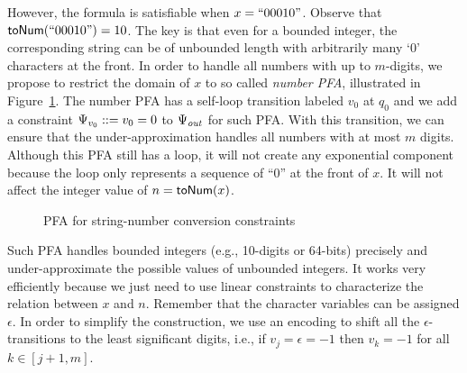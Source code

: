 \documentclass[sigplan,review,anonymous]{acmart}\settopmatter{printfolios=true,printccs=false,printacmref=false}
\begin{document}
However, the formula is satisfiable when $x=``00010"$. Observe that $\mbox{\textsf{toNum}($``00010"$)}=10$. The key is that even for a bounded integer, the corresponding string can be of unbounded length with arbitrarily many `$0$' characters at the front. In order to handle all numbers with up to $m$-digits, we propose to restrict the domain of $x$ to so called \emph{number PFA}, illustrated in Figure~\ref{fig:sfa_its}. The number PFA has a self-loop transition labeled $v_0$ at $q_0$ and we add a constraint $\Psi_{v_0}::= v_0=0$ to $\Psi_{\mathit{out}}$ for such PFA. With this transition, we can ensure that the under-approximation handles all numbers with at most $m$ digits. Although this PFA still has a loop, it will not create any exponential component because the loop only represents a sequence of ``0'' at the front of $x$. It will not affect the integer value of $n=\mbox{\textsf{toNum}($x$)}$.

\begin{figure}
	
	\caption{PFA for string-number conversion constraints}
	\label{fig:sfa_its}
\end{figure}

Such PFA handles bounded integers (e.g., 10-digits or 64-bits) precisely and under-approximate the possible values of unbounded integers. It works very efficiently because we just need to use linear constraints to characterize the relation between $x$ and $n$. 
Remember that the character variables can be assigned $\epsilon$. In order to simplify the construction, we use an encoding to shift all the $\epsilon$-transitions to the least significant digits, i.e., if $v_j = \epsilon = -1$ then $v_k = -1$ for all $k\in [j+1,m]$. 
\end{document}
